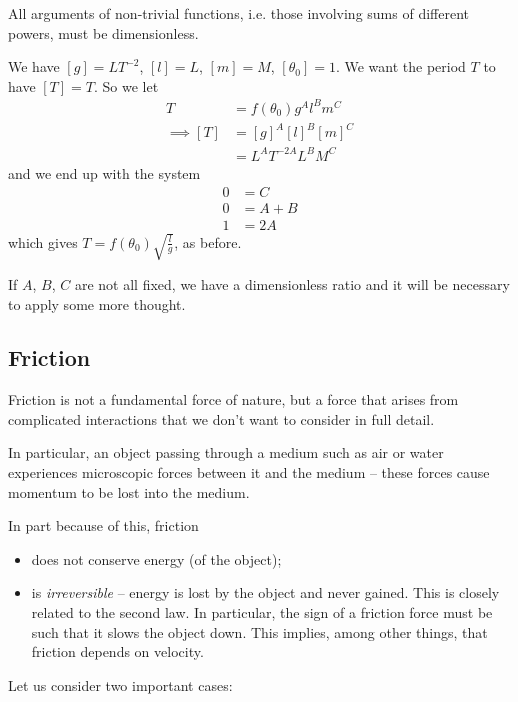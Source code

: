\documentclass{../template/note}
\begin{document}
    \begin{corollary}
        All arguments of non-trivial functions, i.e. those involving sums of different powers, must be dimensionless.
    \end{corollary}
    
    \begin{example*}
        We have \([g] = \si{LT^{-2}}\), \([l] = \si{L}\), \([m] = \si{M}\), \([\theta_0] = 1\). We want the period \(T\) to have \([T] = \si{T}\). So we let
        \begin{align*}
            T &= f(\theta_0) g^A l^B m^C \\
            \implies [T] &= [g]^A [l]^B [m]^C \\
            &= \si{L^A T^{-2A} L^B M^C}
        \end{align*}
        and we end up with the system
        \begin{align*}
            0 &= C \\
            0 &= A + B \\
            1 &= 2A
        \end{align*}
        which gives \(T = f(\theta_0) \sqrt{\frac l g}\), as before.
    \end{example*}
    
    If \(A\), \(B\), \(C\) are not all fixed, we have a dimensionless ratio and it will be necessary to apply some more thought.


    \subsection{Friction}

    Friction is not a fundamental force of nature, but a force that arises from complicated interactions that we don't want to consider in full detail.

    In particular, an object passing through a medium such as air or water experiences microscopic forces between it and the medium -- these forces cause momentum to be lost into the medium.

    In part because of this, friction
    \begin{itemize}
        \item does not conserve energy (of the object);
        \item is \emph{irreversible} -- energy is lost by the object and never gained. This is closely related to the second law. In particular, the sign of a friction force must be such that it slows the object down. This implies, among other things, that friction depends on velocity.
    \end{itemize}
    Let us consider two important cases:
\end{document}

